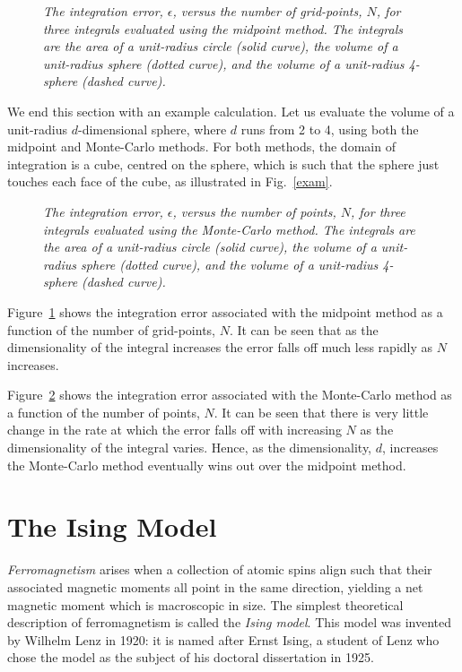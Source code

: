 \begin{figure}
\epsfysize=3in
\centerline{}
\caption{\em The integration error, $\epsilon$, versus the number of grid-points, $N$, for three
integrals evaluated using the midpoint method. The integrals are the
area of a unit-radius circle (solid curve), the volume of a unit-radius
sphere (dotted curve), and the volume of a unit-radius 4-sphere (dashed curve).}\label{midpoint}
\end{figure}

We end this section with an example calculation. Let us evaluate the volume of a unit-radius $d$-dimensional sphere, where $d$
runs from 2 to 4, using both the midpoint and Monte-Carlo methods. For
both methods, the domain of integration is a  cube, centred on the sphere, which is
such that the sphere just touches each face of the cube, as illustrated in Fig.~\ref{exam}.
\begin{figure}
\epsfysize=3in
\centerline{}
\caption{\em The integration error, $\epsilon$, versus the number of points, $N$, for three
integrals evaluated using the Monte-Carlo method. The integrals are the
area of a unit-radius circle (solid curve), the volume of a unit-radius
sphere (dotted curve), and the volume of a unit-radius 4-sphere (dashed curve).}\label{montecarlo}
\end{figure}

Figure~\ref{midpoint} shows the integration error associated with the midpoint method
as a function of the number of grid-points, $N$. It can be seen that as the dimensionality
of the integral increases the error falls off much less rapidly as $N$ increases.

Figure~\ref{montecarlo} shows the integration error associated with the Monte-Carlo method
as a function of the number of points, $N$. It can be seen that there is very little
change in the rate at which the error falls off with increasing $N$
as the dimensionality of the integral varies. Hence, as the dimensionality, $d$, increases the Monte-Carlo method
eventually wins out over the midpoint method.

\section{The Ising Model}
{\em Ferromagnetism} arises when a collection of atomic spins align such that
their associated magnetic moments all point in the same direction, yielding a
net magnetic moment which is macroscopic in size. The simplest theoretical
description of ferromagnetism is called the {\em Ising model}. This model
was invented by Wilhelm Lenz in 1920: it is named after
Ernst Ising, a student of Lenz who chose the model as the subject of his
doctoral dissertation in 1925.

